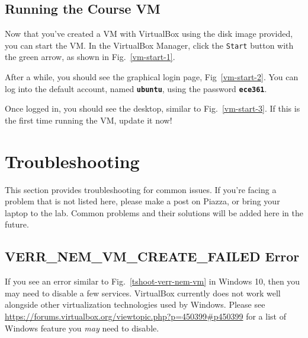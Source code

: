 \documentclass[11pt]{article}
\begin{document}
\subsection{Running the Course VM}
\label{subsec:run-vm}
Now that you've created a VM with VirtualBox using the disk image provided, you can start the VM. In the VirtualBox Manager, click the \texttt{Start} button with the green arrow, as shown in Fig.~\ref{vm-start-1}.

After a while, you should see the graphical login page, Fig~\ref{vm-start-2}. You can log into the default account, named \textbf{\texttt{ubuntu}}, using the password \textbf{\texttt{ece361}}.

Once logged in, you should see the desktop, similar to Fig.~\ref{vm-start-3}. If this is the first time running the VM, update it now!


\section{Troubleshooting}
\label{sec:troubleshooting}
This section provides troubleshooting for common issues. If you're facing a problem that is not listed here, please make a post on Piazza, or bring your laptop to the lab. Common problems and their solutions will be added here in the future.

\subsection{VERR\_NEM\_VM\_CREATE\_FAILED Error}
If you see an error similar to Fig.~\ref{tshoot-verr-nem-vm} in Windows 10, then you may need to disable a few services. VirtualBox currently does not work well alongside other virtualization technologies used by Windows. Please see \url{https://forums.virtualbox.org/viewtopic.php?p=450399#p450399} for a list of Windows feature you \textit{may} need to disable.
\end{document}
